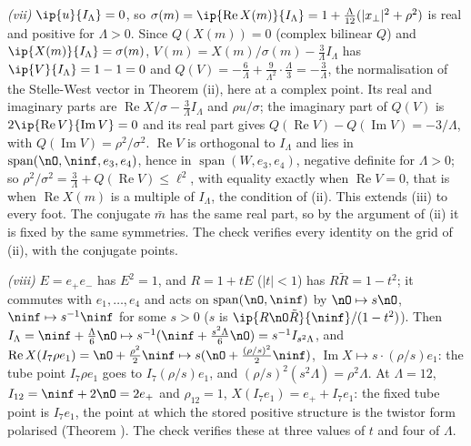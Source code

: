 \emph{(vii)} $\ip{u}{I_{\Lambda}} = 0$, so $\sigma(m) = \ip{\operatorname{Re}X(m)}{I_{\Lambda}} = 1 + \tfrac{\Lambda}{12}(|x_{\perp}|^{2} + \rho^{2})$ is real and positive for $\Lambda > 0$. Since $Q(X(m)) = 0$ (complex bilinear $Q$) and $\ip{X(m)}{I_{\Lambda}} = \sigma(m)$, $V(m) = X(m)/\sigma(m) - \tfrac{3}{\Lambda}I_{\Lambda}$ has $\ip{V}{I_{\Lambda}} = 1 - 1 = 0$ and $Q(V) = -\tfrac{6}{\Lambda} + \tfrac{9}{\Lambda^{2}}\cdot\tfrac{\Lambda}{3} = -\tfrac{3}{\Lambda}$, the normalisation of the Stelle-West vector in Theorem (ii), here at a complex point. Its real and imaginary parts are $\operatorname{Re}X/\sigma - \tfrac{3}{\Lambda}I_{\Lambda}$ and $\rho u/\sigma$; the imaginary part of $Q(V)$ is $2\ip{\operatorname{Re}V}{\operatorname{Im}V} = 0$ and its real part gives $Q(\operatorname{Re}V) - Q(\operatorname{Im}V) = -3/\Lambda$, with $Q(\operatorname{Im}V) = \rho^{2}/\sigma^{2}$. $\operatorname{Re}V$ is orthogonal to $I_{\Lambda}$ and lies in $\operatorname{span}(\nO, \ninf, e_{3}, e_{4})$, hence in $\operatorname{span}(W, e_{3}, e_{4})$, negative definite for $\Lambda > 0$; so $\rho^{2}/\sigma^{2} = \tfrac{3}{\Lambda} + Q(\operatorname{Re}V) \le \ell^{2}$, with equality exactly when $\operatorname{Re}V = 0$, that is when $\operatorname{Re}X(m)$ is a multiple of $I_{\Lambda}$, the condition of (ii). This extends (iii) to every foot. The conjugate $\bar m$ has the same real part, so by the argument of (ii) it is fixed by the same symmetries. The check verifies every identity on the grid of (ii), with the conjugate points.

\emph{(viii)} $E = e_{+}e_{-}$ has $E^{2} = 1$, and $R = 1 + tE$ ($|t| < 1$) has $R\tilde R = 1 - t^{2}$; it commutes with $e_{1}, \dots, e_{4}$ and acts on $\operatorname{span}(\nO, \ninf)$ by $\nO \mapsto s\nO$, $\ninf \mapsto s^{-1}\ninf$ for some $s > 0$ ($s$ is $\ip{R\nO\tilde R}{\ninf}/(1 - t^{2})$). Then $I_{\Lambda} = \ninf + \tfrac{\Lambda}{6}\nO \mapsto s^{-1}(\ninf + \tfrac{s^{2}\Lambda}{6}\nO) = s^{-1}I_{s^{2}\Lambda}$, and $\operatorname{Re}X(I_{7}\rho e_{1}) = \nO + \tfrac{\rho^{2}}{2}\ninf \mapsto s(\nO + \tfrac{(\rho/s)^{2}}{2}\ninf)$, $\operatorname{Im}X \mapsto s\cdot(\rho/s)e_{1}$: the tube point $I_{7}\rho e_{1}$ goes to $I_{7}(\rho/s)e_{1}$, and $(\rho/s)^{2}(s^{2}\Lambda) = \rho^{2}\Lambda$. At $\Lambda = 12$, $I_{12} = \ninf + 2\nO = 2e_{+}$ and $\rho_{12} = 1$, $X(I_{7}e_{1}) = e_{+} + I_{7}e_{1}$: the fixed tube point is $I_{7}e_{1}$, the point at which the stored positive structure is the twistor form polarised (Theorem ). The check verifies these at three values of $t$ and four of $\Lambda$.

